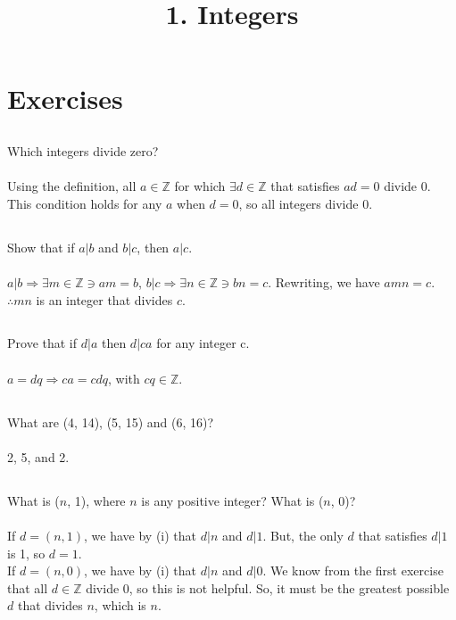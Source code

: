 \documentclass{article}
\begin{document}
\newcommand{\Z}{\mathbb{Z}}

\title{1. Integers}
\section{Exercises}

\subsection{}
Which integers divide zero? \\~\\
Using the definition, all $a \in \Z$ for which $\exists d \in \Z$ that satisfies $ad = 0$ divide 0.
This condition holds for any $a$ when $d = 0$, so all integers divide 0.

\subsection{}
Show that if $a|b$ and $b|c$, then $a|c$. \\~\\
$a|b \Rightarrow \exists m \in \Z \ni am = b$, $b|c \Rightarrow \exists n \in \Z \ni bn = c$.
Rewriting, we have $amn = c$. $\therefore mn$ is an integer that divides $c$.

\subsection{}
Prove that if $d|a$ then $d|ca$ for any integer c. \\~\\
$a = dq \Rightarrow ca = cdq$, with $cq \in \Z$.

\subsection{}
What are (4, 14), (5, 15) and (6, 16)? \\~\\
2, 5, and 2.

\subsection{}
What is ($n$, 1), where $n$ is any positive integer? What is ($n$, 0)? \\~\\
If $d = (n, 1)$, we have by (i) that $d|n$ and $d|1$.
But, the only $d$ that satisfies $d|1$ is 1, so $d = 1$. \\
If $d = (n, 0)$, we have by (i) that $d|n$ and $d|0$.
We know from the first exercise that all $d \in \Z$ divide 0, so this is not helpful.
So, it must be the greatest possible $d$ that divides $n$, which is $n$.
\end{document}
